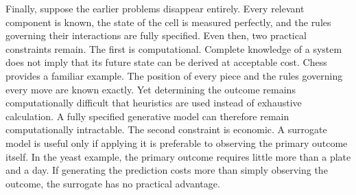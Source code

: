 \documentclass[twocolumn]{article} %
\begin{document}
Finally, suppose the earlier problems disappear entirely. Every relevant component is known, the state of the cell is measured perfectly, and the rules governing their interactions are fully specified. Even then, two practical constraints remain. The first is computational. Complete knowledge of a system does not imply that its future state can be derived at acceptable cost. Chess provides a familiar example. The position of every piece and the rules governing every move are known exactly. Yet determining the outcome remains computationally difficult that heuristics are used instead of exhaustive calculation. A fully specified generative model can therefore remain computationally intractable. The second constraint is economic. A surrogate model is useful only if applying it is preferable to observing the primary outcome itself. In the yeast example, the primary outcome requires little more than a plate and a day. If generating the prediction costs more than simply observing the outcome, the surrogate has no practical advantage.
\end{document}

